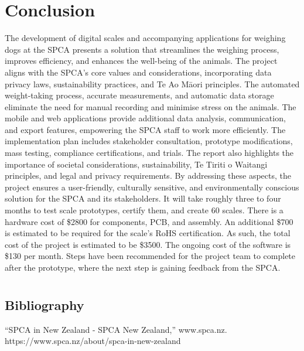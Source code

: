 
\chapter{Conclusion}

The development of digital scales and accompanying applications for weighing dogs at the SPCA presents a solution that streamlines the weighing process, improves efficiency, and enhances the well-being of the animals. The project aligns with the SPCA's core values and considerations, incorporating data privacy laws, sustainability practices, and Te Ao Māori principles. The automated weight-taking process, accurate measurements, and automatic data storage eliminate the need for manual recording and minimise stress on the animals. The mobile and web applications provide additional data analysis, communication, and export features, empowering the SPCA staff to work more efficiently. The implementation plan includes stakeholder consultation, prototype modifications, mass testing, compliance certifications, and trials. The report also highlights the importance of societal considerations, sustainability, Te Tiriti o Waitangi principles, and legal and privacy requirements. By addressing these aspects, the project ensures a user-friendly, culturally sensitive, and environmentally conscious solution for the SPCA and its stakeholders. It will take roughly three to four months to test scale prototypes, certify them, and create 60 scales. There is a hardware cost of \$2800 for components, PCB, and assembly. An additional \$700 is estimated to be required for the scale's RoHS certification. As such, the total cost of the project is estimated to be \$3500. The ongoing cost of the software is \$130 per month. Steps have been recommended for the project team to complete after the prototype, where the next step is gaining feedback from the SPCA.

\chapter{}
\section{Bibliography}

“SPCA in New Zealand - SPCA New Zealand,” www.spca.nz. https://www.spca.nz/about/spca-in-new-zealand

